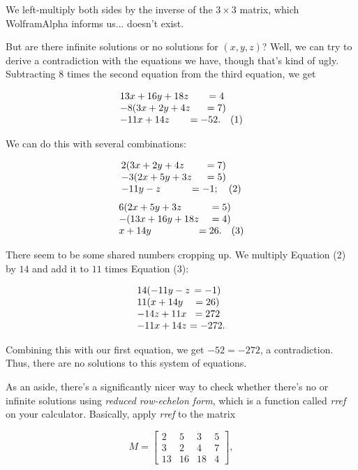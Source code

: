\documentclass[../key.tex]{subfiles}
\begin{document}
We left-multiply both sides by the inverse of the $3\times 3$ matrix, which WolframAlpha informs us... doesn't exist.

But are there infinite solutions or no solutions for $(x,y,z)$? Well, we can try to derive a contradiction with the equations we have, though that's kind of ugly. Subtracting $8$ times the second equation from the third equation, we get

$$\arraycolsep=0pt\begin{array}{lc}
13x+16y+18z &= 4 \\
-8( 3x + 2y + 4z &= 7) \\
-11x+14z &= -52.\quad (1) \\
\end{array}$$

We can do this with several combinations:

$$\arraycolsep=0pt\begin{array}{lc}
2(3x+2y+4z &= 7) \\
-3(2x+5y+3z &= 5) \\
-11y-z &= -1;\quad (2) \\
\end{array}$$
$$\arraycolsep=0pt\begin{array}{lc}
6(2x+5y+3z &= 5) \\
-(13x+16y+18z &= 4) \\
x+14y &= 26.\quad (3) \\
\end{array}$$

There seem to be some shared numbers cropping up. We multiply Equation (2) by $14$ and add it to $11$ times Equation (3):

$$\arraycolsep=0pt\begin{array}{lc}
14(-11y-z &= -1) \\
11(x+14y &= 26) \\
-14z+11x &= 272 \\
-11x+14z &= -272.
\end{array}$$

Combining this with our first equation, we get $-52 = -272$, a contradiction. Thus, there are no solutions to this system of equations.

As an aside, there's a significantly nicer way to check whether there's no or infinite solutions using \textit{reduced row-echelon form}, which is a function called \textit{rref} on your calculator. Basically, apply \textit{rref} to the matrix

$$M=\begin{bmatrix} 2 & 5 & 3 & 5 \\ 3 & 2 & 4 & 7 \\ 13 & 16 & 18 & 4 \end{bmatrix},$$
\end{document}

